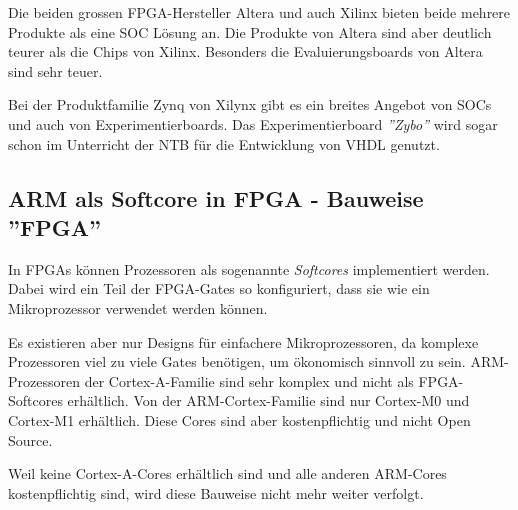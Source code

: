 Die beiden grossen FPGA-Hersteller Altera und auch Xilinx bieten beide mehrere Produkte als eine SOC Lösung an.
Die Produkte von Altera sind aber deutlich teurer als die Chips von Xilinx.
Besonders die Evaluierungsboards von Altera sind sehr teuer.

Bei der Produktfamilie Zynq von Xilynx gibt es ein breites Angebot von SOCs und auch von Experimentierboards.
Das Experimentierboard \textit{''Zybo''} wird sogar schon im Unterricht der NTB für die Entwicklung von VHDL genutzt.


\subsection{ARM als Softcore in FPGA - Bauweise ''FPGA''}
In FPGAs können Prozessoren als sogenannte \textit{Softcores} implementiert werden.
Dabei wird ein Teil der FPGA-Gates so konfiguriert, dass sie wie ein Mikroprozessor verwendet werden können.

Es existieren aber nur Designs für einfachere Mikroprozessoren, da komplexe Prozessoren viel zu viele Gates benötigen, um ökonomisch sinnvoll zu sein.
ARM-Prozessoren der Cortex-A-Familie sind sehr komplex und nicht als FPGA-Softcores erhältlich.
Von der ARM-Cortex-Familie sind nur Cortex-M0 und Cortex-M1 erhältlich.
Diese Cores sind aber kostenpflichtig und nicht Open Source.

Weil keine Cortex-A-Cores erhältlich sind und alle anderen ARM-Cores kostenpflichtig sind, wird diese Bauweise nicht mehr weiter verfolgt.



